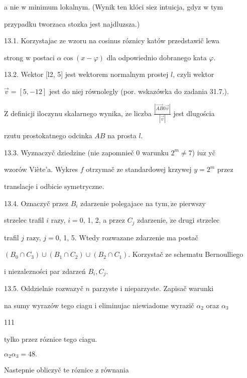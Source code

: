 \documentclass[a4paper,12pt]{article}
\begin{document}
a nie $\mathrm{w}$ minimum lokalnym. (Wynik ten klóci $\mathrm{s}\mathrm{i}\mathrm{e}\mathrm{z}$ intuicja, gdyz $\mathrm{w}$ tym

przypadku tworzaca stozka jest najdluzsza.)

13.1. Korzystajac ze wzoru na cosinus róznicy katów przedstawič lewa

strong $\mathrm{w}$ postaci $\alpha\cos(x-\varphi)$ dla odpowiednio dobranego kata $\varphi.$

13.2. Wektor [l2, 5] jest wektorem normalnym prostej $l$, czyli wektor

$\vec{v}= [5,-12]$ jest do niej równolegly (por. wskazówka do zadania 31.7.).

$\mathrm{Z}$ definicji iloczynu skalarnego wynika, $\dot{\mathrm{z}}\mathrm{e}$ liczba $\displaystyle \frac{|\vec{AB}0\vec{v}|}{|\vec{v}|}$ jest dlugościa

rzutu prostokatnego odcinka $AB$ na prosta $l.$

13.3. Wyznaczyč dziedzine (nie zapomnieč $0$ warunku $2^{m}\neq 7$) $\mathrm{i}\mathrm{u}\dot{\mathrm{z}}$ yč

wzorów Viète'a. Wykres $f$ otrzymač ze standardowej krzywej $y=2^{m}$ przez

translacje $\mathrm{i}$ odbicie symetryczne.

13.4. Oznaczyč przez $B_{i}$ zdarzenie polegajace na $\mathrm{t}\mathrm{y}\mathrm{m}, \dot{\mathrm{z}}\mathrm{e}$ pierwszy

strzelec trafil $i$ razy, $i=0$, 1, 2, a przez $C_{j}$ zdarzenie, $\dot{\mathrm{z}}\mathrm{e}$ drugi strzelec

trafil $j$ razy, $j = 0$, 1, 5. Wtedy rozwazane zdarzenie ma postač

$(B_{0}\cap C_{3})\cup(B_{1}\cap C_{2})\cup(B_{2}\cap C_{1})$. Korzystač ze schematu Bernoulliego

$\mathrm{i}$ niezalezności par zdarzeń $B_{i}, C_{j}.$

13.5. Oddzielnie rozwazyč $n$ parzyste $\mathrm{i}$ nieparzyste. Zapisač warunki

na sumy wyrazów tego ciagu $\mathrm{i}$ eliminujac niewiadome wyrazič $\alpha_{2}$ oraz $\alpha_{3}$





111

tylko przez róznice tego ciagu.

$\alpha_{2}\alpha_{3}=48.$

Nastepnie obliczyč te róznice z równania
\end{document}

